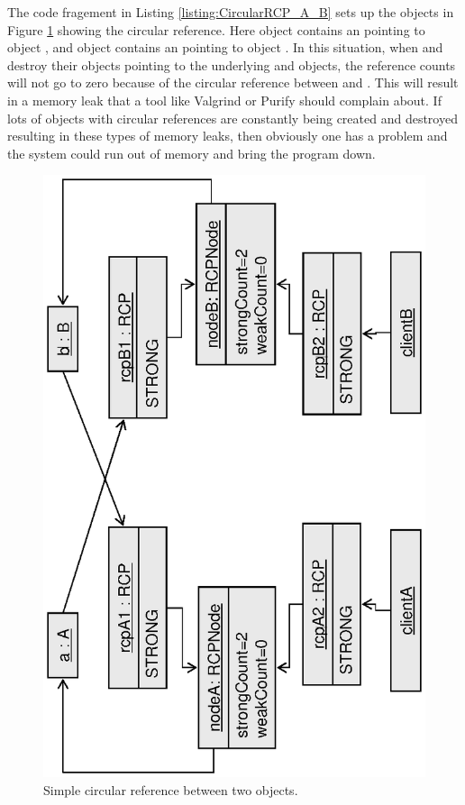 \documentclass[pdf,ps2pdf,11pt]{SANDreport}
\begin{document}
The code fragement in Listing {}\ref{listing:CircularRCP_A_B} sets up
the objects in Figure {}\ref{fig:CircularRCP_A_B} showing the circular
reference.  Here object {} contains an {} pointing to
object {}, and object {} contains an {}
pointing to object {}.  In this situation, when {}
and {} destroy their {} objects pointing to the
underlying {} and {} objects, the reference counts will
not go to zero because of the circular reference between {} and
{}.  This will result in a memory leak that a tool like
Valgrind or Purify should complain about.  If lots of objects with
circular references are constantly being created and destroyed
resulting in these types of memory leaks, then obviously one has a
problem and the system could run out of memory and bring the program
down.


{\bsinglespace
\begin{figure}
\begin{center}
\includegraphics*[angle=270,scale=0.65]{CircularRCP_A_B}
\end{center}
\caption{
\label{fig:CircularRCP_A_B}
Simple circular reference between two objects.  }
\end{figure}
\esinglespace}
\end{document}
